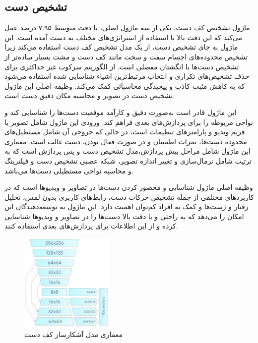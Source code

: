 \subsection{تشخیص دست\protect{}}
ماژول تشخیص کف دست، یکی از سه ماژول اصلی، با دقت متوسط ۷.۹۵ درصد عمل می‌کند که این دقت بالا با استفاده از استراتژی‌های مختلف به دست آمده است. این ماژول به جای تشخیص دست، 
از یک مدل تشخیص کف دست استفاده می‌کند زیرا تشخیص محدوده‌های اجسام سفت و سخت مانند کف دست و مشت بسیار ساده‌تر از تشخیص دست‌ها با انگشتان مفصلی است. از
 الگوریتم سرکوب غیر حداکثری برای حذف تشخیص‌های تکراری و انتخاب مرتبط‌ترین اشیاء شناسایی شده استفاده می‌شود که به کاهش مثبت کاذب و پیچیدگی محاسباتی کمک می‌کند. وظیفه اصلی این ماژول تشخیص دست در تصویر و محاسبه مکان دقیق دست است.

این ماژول قادر است به‌صورت دقیق و کارآمد موقعیت دست‌ها را شناسایی کند و نواحی مربوطه را برای
 پردازش‌های بعدی فراهم کند. ورودی این ماژول شامل تصویر یا فریم ویدیو و پارامترهای تنظیمات است، در حالی که خروجی آن شامل مستطیل‌های محدوده دست‌ها، نمرات اطمینان و در صورت فعال بودن، دست غالب است. معماری این ماژول شامل 
 مراحل پیش پردازش،مدل تشخیص دست و پس پردازش است که به ترتیب شامل نرمال‌سازی و تغییر اندازه تصویر، شبکه عصبی تشخیص دست و فیلترینگ و محاسبه نواحی مستطیلی دست‌ها می‌باشد.

وظیفه اصلی ماژول شناسایی و محصور کردن دست‌ها در تصاویر و ویدیوها است که در کاربردهای مختلفی از جمله تشخیص حرکات دست، رابط‌های کاربری بدون لمس، تحلیل رفتار و ژست‌ها و کمک به افراد کم‌توان
 اهمیت دارد. این ماژول به توسعه‌دهندگان این امکان را می‌دهد که به راحتی و با دقت بالا دست‌ها را در تصاویر و ویدیوها شناسایی کرده و از این اطلاعات برای پردازش‌های بعدی استفاده کنند.


\begin{figure}[h]
    \centering
    \includegraphics[width=0.4\textwidth]{hand_detector.png}
    \caption{معماری مدل آشکارساز کف دست}
\end{figure}


